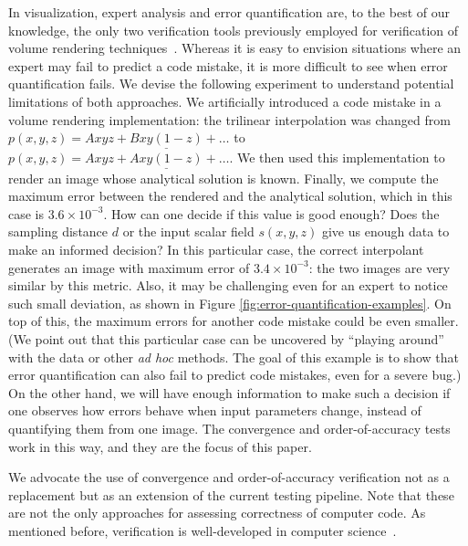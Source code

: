 In visualization, expert analysis and error quantification are, to the
best of our knowledge, the only two verification tools previously employed for
verification of volume rendering
techniques~\cite{Meissner:2000:PEP:353888.353903,
  Moller:1996:CLE:236226.236235,
  Smelyanskiy:2009:MHV:1638611.1639155}. Whereas it is easy to envision
situations where an expert may fail to predict a code mistake, it is
more difficult to see when error quantification fails.  We devise the
following experiment to understand potential limitations of both
approaches. We artificially introduced a code mistake in a volume
rendering implementation: the trilinear interpolation was changed from
$p(x,y,z) = Axyz + \underline{Bxy(1-z)} + \ldots$ to $p(x,y,z) = Axyz
+ \underline{Axy(1-z)} + \ldots$. We then used this implementation to
render an image whose analytical solution is known. Finally, we
compute the maximum error between the rendered and the analytical
solution, which in this case is $3.6 \times 10^{-3}$. How can one
decide if this value is good enough?  Does the sampling distance $d$
or the input scalar field $s(x,y,z)$ give us enough data to make an
informed decision? In this particular case, the correct interpolant
generates an image with maximum error of $3.4 \times 10^{-3}$: the two
images are very similar by this metric. Also, it may be challenging
even for an expert to notice such small deviation, as shown in Figure
\ref{fig:error-quantification-examples}. On top of this, the maximum
errors for another code mistake could be even smaller.
%
(We point out that this particular case can be
uncovered by ``playing around'' with the data or other \emph{ad hoc}
methods. The goal of this example is to show that error quantification
can also fail to predict code mistakes, even for a severe bug.)
%
On the other hand, we will have enough information to make such a
decision if one observes how errors behave when input parameters
change, instead of quantifying them from one image. The convergence
and order-of-accuracy tests work in this way, and they are the focus
of this paper.

We advocate the use of convergence and order-of-accuracy verification
not as a replacement but as an extension of the current testing
pipeline.  
Note that these are not the only approaches for assessing correctness
of computer code. As mentioned before, verification is well-developed
in computer science~\cite{Clarke08,FLO67,godefroid08,
  Yang:2006:UMC:1189256.1189259}. 

